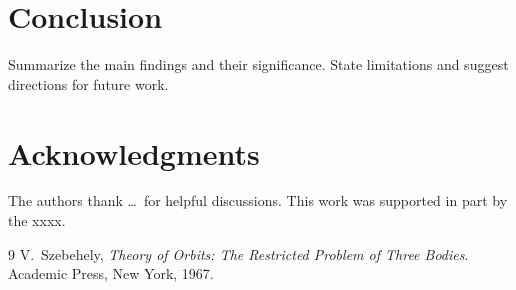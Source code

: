 \documentclass[11pt, letterpaper]{article}
\newcommand{\SponsorText}{%
    This work was supported in part by the xxxx.                %
}
\begin{document}
\section{Conclusion}
\label{sec:conclusion}

Summarize the main findings and their significance. State limitations and suggest
directions for future work.

\section*{Acknowledgments}

The authors thank \ldots\ for helpful discussions. \SponsorText


\begin{thebibliography}{9}
V.~Szebehely,
\textit{Theory of Orbits: The Restricted Problem of Three Bodies}.
Academic Press, New York, 1967.
\end{thebibliography}
\end{document}
